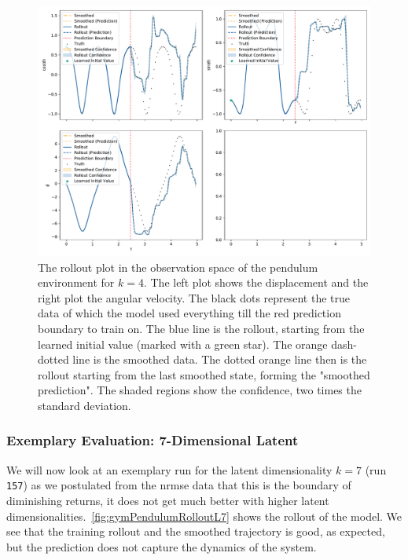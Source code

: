 			\begin{figure}
				\centering
				\includegraphics[width=\linewidth]{figures/results/pendulum-gym/run-latent-dim-04/rollout-observations-N0.pdf}
				\caption{The rollout plot in the observation space of the pendulum environment for \(k = 4\). The left plot shows the displacement and the right plot the angular velocity. The black dots represent the true data of which the model used everything till the red prediction boundary to train on. The blue line is the rollout, starting from the learned initial value (marked with a green star). The orange dash-dotted line is the smoothed data. The dotted orange line then is the rollout starting from the last smoothed state, forming the "smoothed prediction". The shaded regions show the confidence, \ie two times the standard deviation.}
				\label{fig:gymPendulumRolloutL04}
			\end{figure}

		\subsubsection{Exemplary Evaluation: 7-Dimensional Latent}
			\label{subsubsec:gymPendulumL07}

			We will now look at an exemplary run for the latent dimensionality \( k = 7 \) (run \texttt{157}) as we postulated from the \ac{nrmse} data that this is the boundary of diminishing returns, \ie it does not get much better with higher latent dimensionalities.~\autoref{fig:gymPendulumRolloutL7} shows the rollout of the model. We see that the training rollout and the smoothed trajectory is good, as expected, but the prediction does not capture the dynamics of the system.

